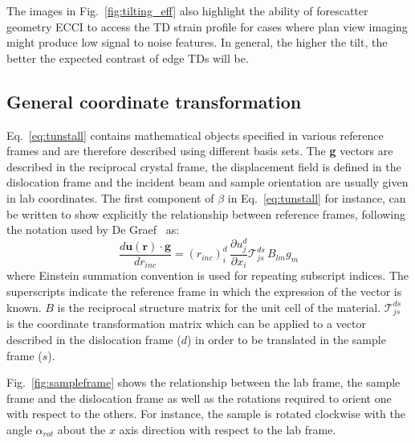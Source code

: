The images in Fig.~\ref{fig:tilting_eff} also highlight the ability of forescatter geometry ECCI to access the TD strain profile for cases where plan view imaging might produce low signal to noise features. In general, the higher the tilt, the better the expected contrast of edge TDs will be.




\subsection{General coordinate transformation}
\label{sec:coordinates}
Eq.~\ref{eq:tunstall} contains mathematical objects specified in various reference frames and are therefore described using different basis sets. The \textbf{g} vectors are described in the reciprocal crystal frame, the displacement field is defined in the dislocation frame and the incident beam and sample orientation are usually given in lab coordinates. The first component of $\beta$ in Eq.~\ref{eq:tunstall} for instance, can be written to show explicitly the relationship between reference frames, following the notation used by De Graef~\cite{MarcTEM03} as:
\begin{equation}
    \frac{d \mathbf{u}(\mathbf{r}) \cdot \mathbf{g}}{d r_{inc}} = (r_{inc})^d_i \, \frac{\partial u^d_j}{\partial x_i} \mathcal{T}^{ds}_{js} \, B_{lm} g_m
\end{equation}
where Einstein summation convention is used for repeating subscript indices. The superscripts indicate the reference frame in which the expression of the vector is known. $B$ is the reciprocal structure matrix for the unit cell of the material.  $\mathcal{T}^{ds}_{js}$ is the coordinate transformation matrix which can be applied to a vector described in the dislocation frame ($d$) in order to be translated in the sample frame ($s$).

Fig.~\ref{fig:sampleframe} shows the relationship between the lab frame, the sample frame and the dislocation frame as well as the rotations required to orient one with respect to the others. For instance, the sample is rotated clockwise with the angle $\alpha_{rot}$ about the $x$ axis direction with respect to the lab frame.

